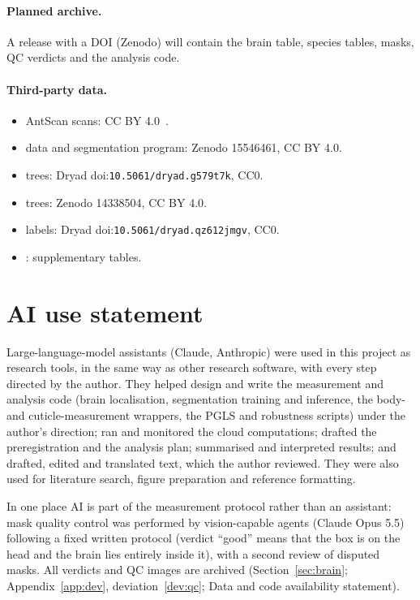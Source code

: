 \documentclass[11pt]{article}
\begin{document}
\paragraph{Planned archive.} A release with a DOI (Zenodo) will contain the brain table, species tables, masks, QC
verdicts and the analysis code.

\paragraph{Third-party data.}
\begin{itemize}[nosep]
\item AntScan scans: CC BY 4.0~\citep{katzke2026}.
\item \citet{matte2025} data and segmentation program: Zenodo 15546461, CC BY 4.0.
\item \citet{economo2018} trees: Dryad doi:\nolinkurl{10.5061/dryad.g579t7k}, CC0.
\item \citet{borowiec2025} trees: Zenodo 14338504, CC BY 4.0.
\item \citet{toulkeridou2023} labels: Dryad doi:\nolinkurl{10.5061/dryad.qz612jmgv}, CC0.
\item \citet{bellroberts2024}: supplementary tables.
\end{itemize}

\section*{AI use statement}

Large-language-model assistants (Claude, Anthropic) were used in this project as research tools, in the same way as
other research software, with every step directed by the author. They helped design and write the measurement and
analysis code (brain localisation, segmentation training and inference, the body- and cuticle-measurement wrappers,
the PGLS and robustness scripts) under the author's direction; ran and monitored the cloud computations; drafted the
preregistration and the analysis plan; summarised and interpreted results; and drafted, edited and translated text,
which the author reviewed. They were also used for literature search, figure preparation and reference formatting.

In one place AI is part of the measurement protocol rather than an assistant: mask quality control was performed by
vision-capable agents (Claude Opus 5.5) following a fixed written protocol (verdict ``good'' means that the box is on
the head and the brain lies entirely inside it), with a second review of disputed masks. All verdicts and QC images
are archived (Section~\ref{sec:brain}; Appendix~\ref{app:dev}, deviation~\ref{dev:qc}; Data and code availability
statement).
\end{document}
